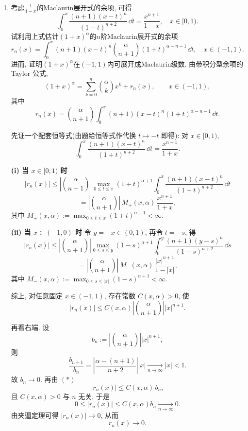 \begin{quiza}
\begin{enumerate}
\begin{proof}
但令 \(u=1-x\to0^+\), 有
\[f(x)=u^n\ee^{1/u}=\frac{\ee^{1/u}}{u^{-n}}\xrightarrow[u\to0^+]{}+\infty,\]
因为指数函数增长快于任何幂函数. 矛盾.
故 \(R\le1\), 结合 \(R\ge1\), 得
\[R=1.\]
再看点 \(x=1\): 若该 Maclaurin 级数在 \(x=1\) 收敛, 仍由 Abel 第二定理应有
\(\lim_{x\to1^-}f(x)\) 有限; 但上式已知该极限为 \(+\infty\).
故其 Maclaurin 级数在 \(x=1\) 处发散.
\end{proof}
\item 考虑\(\frac{1}{1-x}\)的Maclaurin展开式的余项, 可得
\[\int_{0}^{x}\frac{(n+1)(x-t)^n}{(1-t)^{n+2}}\,\dd t
=\frac{x^{n+1}}{1-x},\quad x\in[0,1).\]
试利用上式估计\((1+x)^\alpha\)的\(n\)阶Maclaurin展开式的余项
\[r_n(x)=\int_{0}^{x}(n+1)(x-t)^n\binom{\alpha}{n+1}(1+t)^{\alpha-n-1}\,\dd t,\quad x\in(-1,1).\]
进而, 证明\((1+x)^\alpha\)在\((-1,1)\)内可展开成Maclaurin级数.
由带积分型余项的 Taylor 公式,
\[(1+x)^\alpha=\sum_{k=0}^{n}\binom{\alpha}{k}x^k+r_n(x),\qquad x\in(-1,1),\]
其中
\[r_n(x)=\binom{\alpha}{n+1}\int_{0}^{x}(n+1)(x-t)^n(1+t)^{\alpha-n-1}\,\dd t.\]

先证一个配套恒等式(由题给恒等式作代换 \(t\mapsto -t\) 即得): 对 \(x\in[0,1)\),
\[\int_0^x\frac{(n+1)(x-t)^n}{(1+t)^{n+2}}\,\dd t=\frac{x^{n+1}}{1+x}.\]

\textbf{(i) 当 \(x\in[0,1)\) 时}
\[|r_n(x)|
\le \left|\binom{\alpha}{n+1}\right|
\max_{0\le t\le x}(1+t)^{\alpha+1}
\int_0^x\frac{(n+1)(x-t)^n}{(1+t)^{n+2}}\,\dd t\]
\[=\left|\binom{\alpha}{n+1}\right|\,M_+(x,\alpha)\,\frac{x^{n+1}}{1+x},\]
其中 \(M_+(x,\alpha):=\max_{0\le t\le x}(1+t)^{\alpha+1}<\infty\).

\textbf{(ii) 当 \(x\in(-1,0)\) 时}
令 \(y=-x\in(0,1)\), 再令 \(t=-s\), 得
\[|r_n(x)|
\le\left|\binom{\alpha}{n+1}\right|
\max_{0\le s\le y}(1-s)^{\alpha+1}
\int_0^y\frac{(n+1)(y-s)^n}{(1-s)^{n+2}}\,\dd s\]
\[=\left|\binom{\alpha}{n+1}\right|\,M_-(x,\alpha)\,\frac{|x|^{n+1}}{1-|x|},\]
其中 \(M_-(x,\alpha):=\max_{0\le s\le |x|}(1-s)^{\alpha+1}<\infty\).

综上, 对任意固定 \(x\in(-1,1)\), 存在常数 \(C(x,\alpha)>0\), 使
\[|r_n(x)|\le C(x,\alpha)\left|\binom{\alpha}{n+1}\right||x|^{n+1}.\tag{*}\]

再看右端. 设
\[b_n:=\left|\binom{\alpha}{n+1}\right||x|^{n+1},\]
则
\[\frac{b_{n+1}}{b_n}
=\left|\frac{\alpha-(n+1)}{n+2}\right||x|
\xrightarrow[n\to\infty]{}|x|<1.\]
故 \(b_n\to0\). 再由 \((*)\)
\[|r_n(x)|\le C(x,\alpha)\,b_n,\]
且 \(C(x,\alpha)>0\) 与 \(n\) 无关, 于是
\[0\le |r_n(x)|\le C(x,\alpha)b_n\xrightarrow[n\to\infty]{}0.\]
由夹逼定理可得 \(|r_n(x)|\to0\), 从而
\[r_n(x)\to0.\]


\end{enumerate}
\end{quiza}
